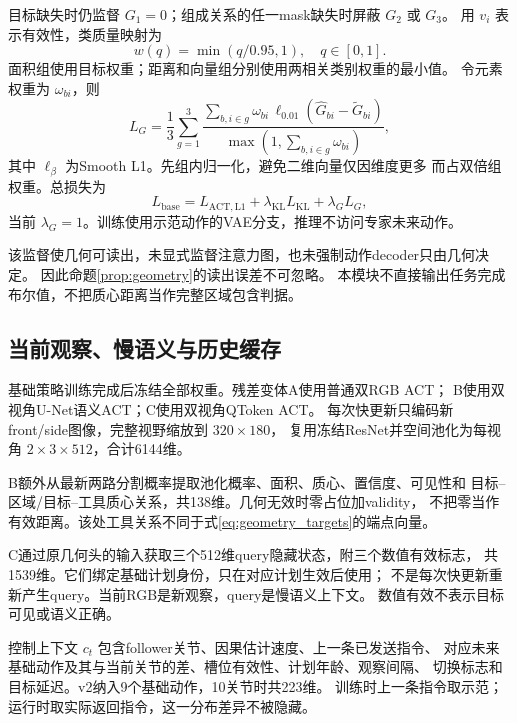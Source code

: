 目标缺失时仍监督 $G_1=0$；组成关系的任一mask缺失时屏蔽 $G_2$ 或 $G_3$。
用 $v_i$ 表示有效性，类质量映射为
\begin{equation}
 w(q)=\min(q/0.95,1),\quad q\in[0,1].
\end{equation}
面积组使用目标权重；距离和向量组分别使用两相关类别权重的最小值。
令元素权重为 $\omega_{bi}$，则
\begin{equation}
 L_G=\frac13\sum_{g=1}^3
 \frac{\sum_{b,i\in g}\omega_{bi}\,
       \ell_{0.01}(\widehat G_{bi}-\widetilde G_{bi})}
      {\max(1,\sum_{b,i\in g}\omega_{bi})},
 \label{eq:geometry_loss}
\end{equation}
其中 $\ell_\beta$ 为Smooth L1。先组内归一化，避免二维向量仅因维度更多
而占双倍组权重。总损失为
\begin{equation}
 L_{\mathrm{base}}=L_{\mathrm{ACT,L1}}
 +\lambda_{\mathrm{KL}}L_{\mathrm{KL}}+\lambda_G L_G,
\end{equation}
当前 $\lambda_G=1$。训练使用示范动作的VAE分支，推理不访问专家未来动作。

该监督使几何可读出，未显式监督注意力图，也未强制动作decoder只由几何决定。
因此命题\ref{prop:geometry}的读出误差不可忽略。
本模块不直接输出任务完成布尔值，不把质心距离当作完整区域包含判据。

\subsection{当前观察、慢语义与历史缓存}

基础策略训练完成后冻结全部权重。残差变体A使用普通双RGB ACT；
B使用双视角U-Net语义ACT；C使用双视角QToken ACT。
每次快更新只编码新front/side图像，完整视野缩放到 $320\times180$，
复用冻结ResNet并空间池化为每视角 $2\times3\times512$，合计6144维。

B额外从最新两路分割概率提取池化概率、面积、质心、置信度、可见性和
目标--区域/目标--工具质心关系，共138维。几何无效时零占位加validity，
不把零当作有效距离。该处工具关系不同于式\eqref{eq:geometry_targets}的端点向量。

C通过原几何头的输入获取三个512维query隐藏状态，附三个数值有效标志，
共1539维。它们绑定基础计划身份，只在对应计划生效后使用；
不是每次快更新重新产生query。当前RGB是新观察，query是慢语义上下文。
数值有效不表示目标可见或语义正确。

控制上下文 $c_t$ 包含follower关节、因果估计速度、上一条已发送指令、
对应未来基础动作及其与当前关节的差、槽位有效性、计划年龄、观察间隔、
切换标志和目标延迟。v2纳入9个基础动作，10关节时共223维。
训练时上一条指令取示范；运行时取实际返回指令，这一分布差异不被隐藏。


